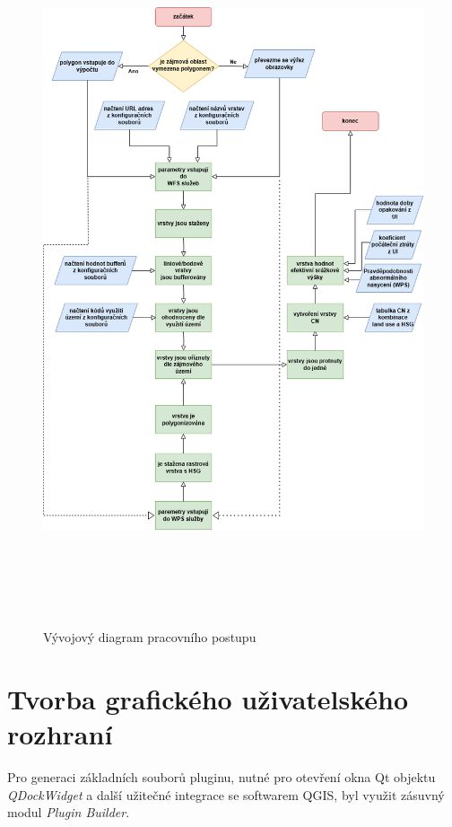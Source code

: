 \documentclass[a4paper,oneside,12pt]{book}
\begin{document}
\begin{figure}[H] \label{obr11}
\centering
\includegraphics[height=21cm]{pictures/diagram.png}
\caption{Vývojový diagram pracovního postupu}
\label{fig:diagram}
\end{figure}

\section{Tvorba grafického uživatelského rozhraní} \label{gui}

\hspace{10mm} Pro generaci základních souborů pluginu, nutné pro otevření okna Qt objektu \textit{QDockWidget} a další užitečné integrace se softwarem QGIS, byl využit zásuvný modul \textit{Plugin Builder}. 
\end{document}
